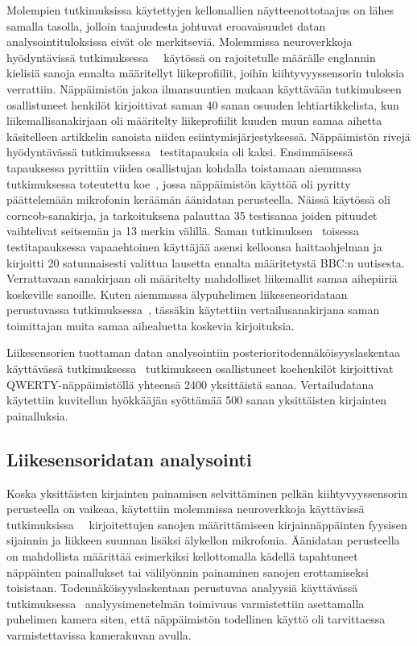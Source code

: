 \documentclass[finnish]{tktltiki2}
\theoremstyle{definition}
\theoremstyle{remark}
\begin{document}
Molempien tutkimuksissa käytettyjen kellomallien näytteenottotaajus on lähes samalla tasolla, jolloin taajuudesta johtuvat eroavaisuudet datan analysointituloksissa eivät ole merkitseviä. Molemmissa neuroverkkoja hyödyntävissä tutkimuksessa~\cite{maiti}~\cite{liu} käytössä on rajoitetulle määrälle englannin kielisiä sanoja ennalta määritellyt liikeprofiilit, joihin kiihtyvyyssensorin tuloksia verrattiin. Näppäimistön jakoa ilmansuuntien mukaan käyttävään tutkimukseen~\cite{maiti} osallistuneet henkilöt kirjoittivat saman 40 sanan osuuden lehtiartikkelista, kun liikemallisanakirjaan oli määritelty liikeprofiilit kuuden muun samaa aihetta käsitelleen artikkelin sanoista niiden esiintymisjärjestyksessä.
Näppäimistön rivejä hyödyntävässä tutkimuksessa~\cite{liu} testitapauksia oli kaksi. Ensimmäisessä tapauksessa pyrittiin viiden osallistujan kohdalla toistamaan aiemmassa tutkimuksessa toteutettu koe~\cite{berger}, jossa näppäimistön käyttöä oli pyritty päättelemään mikrofonin keräämän äänidatan perusteella. Näissä käytössä oli corncob-sanakirja, ja tarkoituksena palauttaa 35 testisanaa joiden pituudet vaihtelivat seitsemän ja 13 merkin välillä. 
Saman tutkimuksen~\cite{liu} toisessa testitapauksessa vapaaehtoinen käyttäjää asensi kelloonsa haittaohjelman ja kirjoitti 20 satunnaisesti valittua lausetta ennalta määritetystä BBC:n uutisesta. Verrattavaan sanakirjaan oli määritelty mahdolliset liikemallit samaa aihepiiriä koskeville sanoille. Kuten aiemmassa älypuhelimen liikesensoridataan perustuvassa tutkimuksessa~\cite{mar}, tässäkin käytettiin vertailusanakirjana saman toimittajan muita samaa aihealuetta koskevia kirjoituksia. 

Liikesensorien tuottaman datan analysointiin posterioritodennäköisyyslaskentaa käyttävässä tutkimuksessa~\cite{mole} tutkimukseen osallistuneet koehenkilöt kirjoittivat QWERTY-näppäimistöllä yhteensä 2400 yksittäistä sanaa. Vertailudatana käytettiin kuvitellun hyökkääjän syöttämää 500 sanan yksittäisten kirjainten painalluksia.


\subsection{Liikesensoridatan analysointi}
Koska yksittäisten kirjainten painamisen selvittäminen pelkän kiihtyvyyssensorin perusteella on vaikeaa, käytettiin molemmissa neuroverkkoja käyttävissä tutkimuksissa~\cite{maiti}~\cite{liu} kirjoitettujen sanojen määrittämiseen kirjainnäppäinten fyysisen sijainnin ja liikkeen suunnan lisäksi älykellon mikrofonia. Äänidatan perusteella on mahdollista määrittää esimerkiksi kellottomalla kädellä tapahtuneet näppäinten painallukset tai välilyönnin painaminen sanojen erottamiseksi toisistaan. Todennäköisyyslaskentaan perustuvaa analyysiä käyttävässä tutkimuksessa~\cite{mole} analyysimenetelmän toimivuus varmistettiin asettamalla puhelimen kamera siten, että näppäimistön todellinen käyttö oli tarvittaessa varmistettavissa kamerakuvan avulla.
\end{document}
